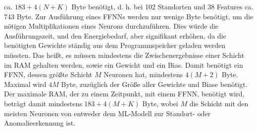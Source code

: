 ca. $183 + 4(N + K)$ Byte benötigt, d. h. bei 102 Standorten und 38 Features ca. 743 Byte.
\newline
\newline
Zur Ausführung eines FFNNs werden nur wenige Byte benötigt, um die nötigen Multiplikationen eines Neurons durchzuführen.
Dies würde die Ausführungszeit, und den Energiebedarf, aber signifikant erhöhen, da die benötigten Gewichte ständig aus dem Programmspeicher geladen werden müssten.
Das heißt, es müssen mindestens die Zwischenergebnisse einer Schicht im RAM gehalten werden, sowie ein Gewicht und ein Bias.
\newline
\newline
Damit benötigt ein FFNN, dessen größte Schicht $M$ Neuronen hat, mindestens $4(M+2)$ Byte.
Maximal wird $4M$ Byte, zuzüglich der Größe aller Gewichte und Biase benötigt.
Der maximale RAM, der zu einem Zeitpunkt, mit einem FFNN, benötigt wird, beträgt damit mindestens $183 + 4(M + K)$ Byte,
wobei $M$ die Schicht mit den meisten Neuronen von entweder dem ML-Modell zur Standort- oder Anomalieerkennung ist.